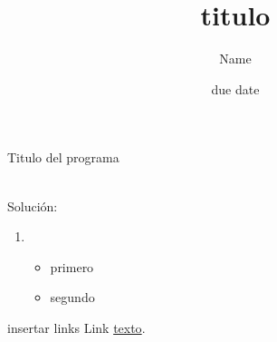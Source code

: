 \documentclass[12pt]{Amariev}
\title{titulo}
\author{Name}
\date{due date}
\begin{document}
    \maketitle

    \begin{problem}{1}{Titulo del programa}
      \lipsum[1]
    \end{problem}
    \\
    \noindent Solución: \\
    \begin{enumerate}
    \renewcommand{\theenumi}{\roman{enumi}}
    \item \lipsum[3]
      \begin{itemize}
        \item primero
        \item segundo
      \end{itemize}
    \end{enumerate}

    \begin{problem}{2}{insertar links}
      Link \href{google.com}{texto}.
    \end{problem}
\end{document}
